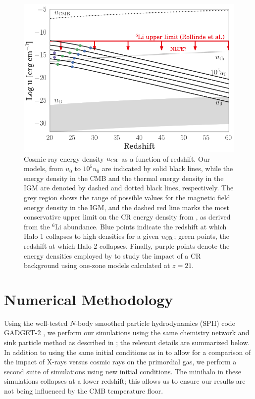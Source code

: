 \documentclass[usenatbib]{mn2e}
\newcommand{\ucr}{{u}_{\rm \small CR}}
\begin{document}
\begin{figure}
\begin{center}
\includegraphics[width=1\columnwidth]{figures/u_cr/u_cr}
\caption{\label{fig:ucr}
Cosmic ray energy density $\ucr$ as a function of redshift.  
Our models, from $u_0$ to $10^5u_0$ are indicated by solid black lines, while the energy density in the CMB and the thermal energy density in the IGM are denoted by dashed and dotted black lines, respectively. 
The grey region shows the range of possible values for the magnetic field energy density in the IGM, and the dashed red line marks the most conservative upper limit on the CR energy density from \citet{RollindeVangioniOlive2006}, as derived from the $^6$Li abundance\footnotemark.
Blue points indicate the redshift at which Halo 1 collapses to high densities for a given $\ucr$; green points, the redshift at which Halo 2 collapses.  
Finally, purple points denote the energy densities employed by \citet{StacyBromm2007} to study the impact of a CR background using one-zone models calculated at $z=21$.}
\end{center}
\end{figure}

\section{Numerical Methodology}
\label{sec:methods}
Using the well-tested $N$-body smoothed particle hydrodynamics (SPH) code GADGET-2 \citep{Springel2005}, we perform our simulations using the same chemistry network and sink particle method as described in \citet{Hummeletal2015}; the relevant details are summarized below.  
In addition to using the same initial conditions as in \citet{Hummeletal2015} to allow for a comparison of the impact of X-rays versus cosmic rays on the primordial gas, we perform a second suite of simulations using new initial conditions.  
The minihalo in these simulations collapses at a lower redshift; this allows us to ensure our results are not being influenced by the CMB temperature floor.
\end{document}

